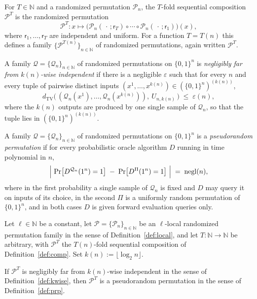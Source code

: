 \documentclass{conjura-conjecture}
\newcommand{\bits}{\{0,1\}}
\newcommand{\NN}{\mathbb{N}}
\newcommand{\cP}{\mathcal{P}}
\newcommand{\cQ}{\mathcal{Q}}
\newcommand{\negl}{\mathrm{negl}}
\newcommand{\dTV}{d_{\mathrm{TV}}}
\newcommand{\rnd}{\mathsf{r}}
\begin{document}
\begin{definition}\label{def:comp}
For $T \in \NN$ and a randomized permutation $\cP_n$, the $T$-fold
sequential composition $\cP^{T}$ is the randomized permutation
\[
  \cP^{T} \colon x \mapsto
  \bigl(\cP_n(\,\cdot\,;\rnd_T) \circ \cdots \circ
  \cP_n(\,\cdot\,;\rnd_1)\bigr)(x),
\]
where $\rnd_1,\dots,\rnd_T$ are independent and uniform. For a function
$T = T(n)$ this defines a family $\{\cP^{T(n)}\}_{n \in \NN}$ of
randomized permutations, again written $\cP^{T}$.
\end{definition}

\begin{definition}
\label{def:kwise}
A family $\cQ = \{\cQ_n\}_{n \in \NN}$ of randomized permutations on
$\bits^n$ is \emph{negligibly far from $k(n)$-wise independent} if there
is a negligible $\varepsilon$ such that for every $n$ and every tuple of
pairwise distinct inputs
$(x^1,\dots,x^{k(n)}) \in (\bits^n)^{(k(n))}$,
\[
  \dTV\bigl(\,(\cQ_n(x^1),\dots,\cQ_n(x^{k(n)})),\ U_{n,k(n)}\,\bigr)
  \;\le\; \varepsilon(n),
\]
where the $k(n)$ outputs are produced by one single sample of $\cQ_n$,
so that the tuple lies in $(\bits^n)^{(k(n))}$.
\end{definition}

\begin{definition}\label{def:prp}
A family $\cQ = \{\cQ_n\}_{n \in \NN}$ of randomized permutations on
$\bits^n$ is a \emph{pseudorandom permutation} if for every
probabilistic oracle algorithm $D$ running in time polynomial in $n$,
\[
  \Bigl|\ \Pr\bigl[D^{\cQ_n}(1^n) = 1\bigr] \;-\;
  \Pr\bigl[D^{\Pi}(1^n) = 1\bigr]\ \Bigr| \;=\; \negl(n),
\]
where in the first probability a single sample of $\cQ_n$ is fixed and
$D$ may query it on inputs of its choice, in the second $\Pi$ is a
uniformly random permutation of $\bits^n$, and in both cases $D$ is
given forward evaluation queries only.
\end{definition}

\begin{conjecture}\label{conj:main}
Let $\ell \in \NN$ be a constant, let $\cP = \{\cP_n\}_{n \in \NN}$ be
an $\ell$-local randomized permutation family in the sense of
Definition~\ref{def:local}, and let $T \colon \NN \to \NN$ be arbitrary,
with $\cP^{T}$ the $T(n)$-fold sequential composition of
Definition~\ref{def:comp}. Set $k(n) := \lfloor \log_2 n \rfloor$.

If $\cP^{T}$ is negligibly far from $k(n)$-wise independent in the sense
of Definition~\ref{def:kwise}, then $\cP^{T}$ is a pseudorandom
permutation in the sense of Definition~\ref{def:prp}.
\end{conjecture}
\end{document}
